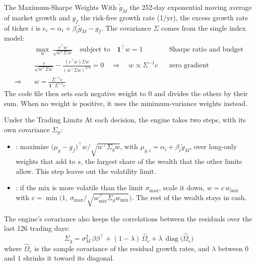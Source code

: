 \documentclass[aspectratio=169,11pt]{beamer}
\begin{document}
\begin{frame}{The Maximum-Sharpe Weights}
  \vspace{0.3em}
  With $\tilde{g}_{M}$ the 252-day exponential moving average of market growth and $g_{f}$ the risk-free
  growth rate (1/yr), the excess growth rate of ticker $i$ is $e_{i}=\alpha_{i}+\beta_{i}\tilde{g}_{M}-g_{f}$.
  The covariance $\Sigma$ comes from the single index model:
  {\setlength{\jot}{2pt}
  \begin{align*}
    &\max_{w}\ \frac{e^{\top}w}{\sqrt{w^{\top}\Sigma\,w}}\quad\text{subject to}\quad\mathbf{1}^{\top}w=1
      && \text{Sharpe ratio and budget}\\
    &\frac{e}{\sqrt{w^{\top}\Sigma w}}-\frac{\left(e^{\top}w\right)\Sigma w}{\left(w^{\top}\Sigma w\right)^{3/2}}=0
      \quad\Longrightarrow\quad w\propto\Sigma^{-1}e && \text{zero gradient}\\
    \Longrightarrow\quad&\boxed{w=\frac{\Sigma^{-1}e}{\mathbf{1}^{\top}\Sigma^{-1}e}}
  \end{align*}}%
  The code file then sets each negative weight to $0$ and divides the others by their sum. When no weight is
  positive, it uses the minimum-variance weights instead.
\end{frame}

\begin{frame}{Under the Trading Limits}
  \vspace{0.3em}
  At each decision, the engine takes two steps, with its own covariance $\Sigma_{g}$:
  \begin{itemize}\setlength{\itemsep}{0.4em}
    \item {}: maximize $\big(\mu_{g}-g_{f}\big)^{\top}w\big/\sqrt{w^{\top}\Sigma_{g}w}$, with $\mu_{g,i}=\alpha_{i}+\beta_{i}\tilde{g}_{M}$, over long-only weights that add to $s$, the largest share of the wealth that the other limits allow. This step leaves out the volatility limit.
    \item {}: if the mix is more volatile than the limit $\sigma_{\max}$, scale it down, $w=c\,w_{\text{mix}}$ with $c=\min\big(1,\ \sigma_{\max}\big/\sqrt{w_{\text{mix}}^{\top}\Sigma_{g}w_{\text{mix}}}\big)$. The rest of the wealth stays in cash.
  \end{itemize}

  The engine's covariance also keeps the correlations between the residuals over the last 126 trading days:
  \[
    \Sigma_{g}=\sigma_{M}^{2}\,\beta\beta^{\top}+(1-\lambda)\,\hat{\Omega}_{\varepsilon}+\lambda\,\operatorname{diag}\big(\hat{\Omega}_{\varepsilon}\big)
  \]
  where $\hat{\Omega}_{\varepsilon}$ is the sample covariance of the residual growth rates, and $\lambda$
  between $0$ and $1$ shrinks it toward its diagonal.
\end{frame}
\end{document}
